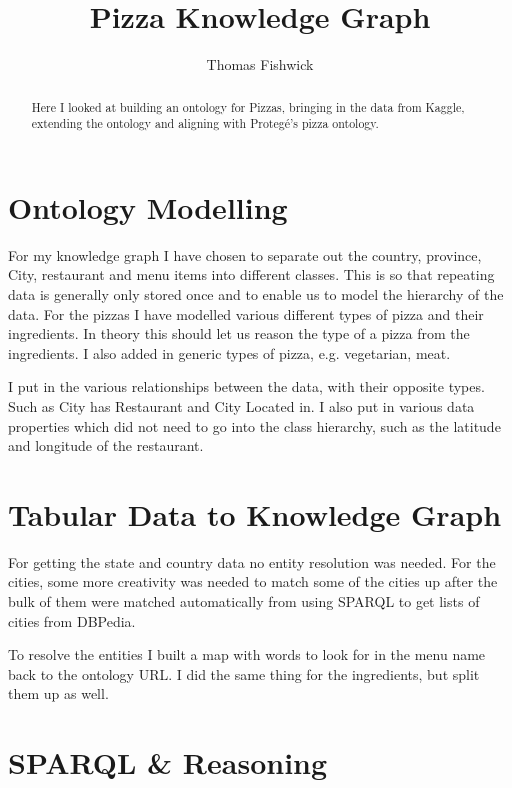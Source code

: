 \documentclass[11pt]{report} %
\title{Pizza Knowledge Graph}
\author{Thomas Fishwick}
\begin{document}
\begin{minipage}{\textwidth}
	\maketitle

	\begin{abstract}
Here I looked at building an ontology for Pizzas, bringing in the data from Kaggle, extending the ontology and aligning with Protegé's pizza ontology.
	\end{abstract}
\end{minipage}

\tableofcontents

\chapter{Ontology Modelling}

For my knowledge graph I have chosen to separate out the country, province, City, restaurant and menu items into different classes.
This is so that repeating data is generally only stored once and to enable us to model the hierarchy of the data.
For the pizzas I have modelled various different types of pizza and their ingredients.
In theory this should let us reason the type of a pizza from the ingredients. I also added in generic types of pizza, e.g. vegetarian, meat.

I put in the various relationships between the data, with their opposite types. Such as City has Restaurant and City Located in.
I also put in various data properties which did not need to go into the class hierarchy, such as the latitude and longitude of the restaurant.

\chapter{Tabular Data to Knowledge Graph}

For getting the state and country data no entity resolution was needed.
For the cities, some more creativity was needed to match some of the cities up after the bulk of them were matched automatically from using SPARQL to get lists of cities from DBPedia.

To resolve the entities I built a map with words to look for in the menu name back to the ontology URL. I did the same thing for the ingredients, but split them up as well.

\chapter{SPARQL \& Reasoning}
\end{document}
